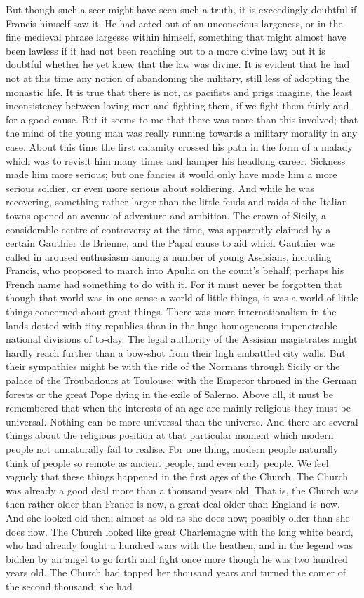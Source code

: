 \documentclass{book}
\begin{document}
But though such a seer might have seen such a truth, it is exceedingly doubtful if Francis himself saw it. He had acted out of an unconscious largeness, or in the fine medieval phrase largesse within himself, something that might almost have been lawless if it had not been reaching out to a more divine law; but it is doubtful whether he yet knew that the law was divine. It is evident that he had not at this time any notion of abandoning the military, still less of adopting the monastic life. It is true that there is not, as pacifists and prigs imagine, the least inconsistency between loving men and fighting them, if we fight them fairly and for a good cause. But it seems to me that there was more than this involved; that the mind of the young man was really running towards a military morality in any case. About this time the first calamity crossed his path in the form of a malady which was to revisit him many times and hamper his headlong career. Sickness made him more serious; but one fancies it would only have made him a more serious soldier, or even more serious about soldiering. And while he was recovering, something rather larger than the little feuds and raids of the Italian towns opened an avenue of adventure and ambition. The crown of Sicily, a considerable centre of controversy at the time, was apparently claimed by a certain Gauthier de Brienne, and the Papal cause to aid which Gauthier was called in aroused enthusiasm among a number of young Assisians, including Francis, who proposed to march into Apulia on the count’s behalf; perhaps his French name had something to do with it. For it must never be forgotten that though that world was in one sense a world of little things, it was a world of little things concerned about great things. There was more internationalism in the lands dotted with tiny republics than in the huge homogeneous impenetrable national divisions of to-day. The legal authority of the Assisian magistrates might hardly reach further than a bow-shot from their high embattled city walls. But their sympathies might be with the ride of the Normans through Sicily or the palace of the Troubadours at Toulouse; with the Emperor throned in the German forests or the great Pope dying in the exile of Salerno. Above all, it must be remembered that when the interests of an age are mainly religious they must be universal. Nothing can be more universal than the universe. And there are several things about the religious position at that particular moment which modern people not unnaturally fail to realise. For one thing, modern people naturally think of people so remote as ancient people, and even early people. We feel vaguely that these things happened in the first ages of the Church. The Church was already a good deal more than a thousand years old. That is, the Church was then rather older than France is now, a great deal older than England is now. And she looked old then; almost as old as she does now; possibly older than she does now. The Church looked like great Charlemagne with the long white beard, who had already fought a hundred wars with the heathen, and in the legend was bidden by an angel to go forth and fight once more though he was two hundred years old. The Church had topped her thousand years and turned the comer of the second thousand; she had 
\end{document}
